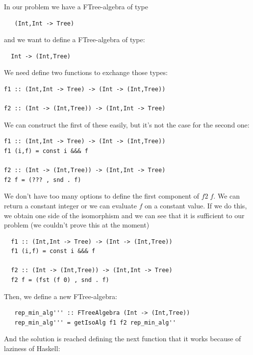 \documentclass[a4paper,10pt]{article}
\begin{document}
\noindent In our problem we have a FTree-algebra of type
  
\begin{lstlisting}
   (Int,Int -> Tree)
\end{lstlisting}

\noindent and we want to define a FTree-algebra of type:

\begin{lstlisting}
  Int -> (Int,Tree)
\end{lstlisting} 

\noindent We need define two functions to exchange those types:
  
\begin{lstlisting}
f1 :: (Int,Int -> Tree) -> (Int -> (Int,Tree))
  
f2 :: (Int -> (Int,Tree)) -> (Int,Int -> Tree)
\end{lstlisting}

\noindent We can construct the first of these easily, but it's not the case for the second one:

\begin{lstlisting}
f1 :: (Int,Int -> Tree) -> (Int -> (Int,Tree))
f1 (i,f) = const i &&& f

f2 :: (Int -> (Int,Tree)) -> (Int,Int -> Tree)
f2 f = (??? , snd . f)
\end{lstlisting}

We don't have too many options to define the first component of $f2\;f$. We can
return a constant integer or we can evaluate $f$ on a constant value. If we do this,
we obtain one side of the isomorphism and we can see that it is sufficient to our problem
(we couldn't prove this at the moment)

  \begin{lstlisting}
  f1 :: (Int,Int -> Tree) -> (Int -> (Int,Tree))
  f1 (i,f) = const i &&& f

  f2 :: (Int -> (Int,Tree)) -> (Int,Int -> Tree)
  f2 f = (fst (f 0) , snd . f)
  \end{lstlisting}

  Then, we define a new FTree-algebra:
  
  \begin{lstlisting}
   rep_min_alg''' :: FTreeAlgebra (Int -> (Int,Tree))
   rep_min_alg''' = getIsoAlg f1 f2 rep_min_alg''
  \end{lstlisting}

  And the solution is reached defining the next function that it works because of laziness of Haskell:
  
\end{document}
